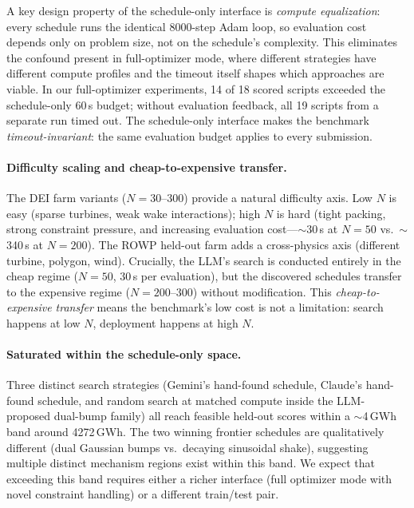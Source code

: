 A key design property of the schedule-only interface is
\emph{compute equalization}: every schedule runs the identical
8000-step Adam loop, so evaluation cost depends only on problem
size, not on the schedule's complexity. This eliminates the
confound present in full-optimizer mode, where different strategies
have different compute profiles and the timeout itself shapes which
approaches are viable. In our full-optimizer experiments, 14 of 18
scored scripts exceeded the schedule-only 60\,s budget; without
evaluation feedback, all 19 scripts from a separate run timed out.
The schedule-only interface makes the benchmark \emph{timeout-invariant}:
the same evaluation budget applies to every submission.

\paragraph{Difficulty scaling and cheap-to-expensive transfer.}
The DEI farm variants ($N = 30$--$300$) provide a natural difficulty
axis. Low $N$ is easy (sparse turbines, weak wake interactions);
high $N$ is hard (tight packing, strong constraint pressure,
and increasing evaluation cost---$\sim$30\,s at $N\!=\!50$ vs.\
$\sim$340\,s at $N\!=\!200$). The ROWP held-out farm adds a
cross-physics axis (different turbine, polygon, wind). Crucially,
the LLM's search is conducted entirely in the cheap regime
($N\!=\!50$, 30\,s per evaluation), but the discovered schedules
transfer to the expensive regime ($N\!=\!200$--$300$) without
modification. This \emph{cheap-to-expensive transfer} means the
benchmark's low cost is not a limitation: search happens at
low $N$, deployment happens at high $N$.

\paragraph{Saturated within the schedule-only space.}
Three distinct search strategies (Gemini's hand-found schedule,
Claude's hand-found schedule, and random search at matched compute
inside the LLM-proposed dual-bump family) all reach feasible held-out
scores within a $\sim$4\,GWh band around 4272\,GWh. The two winning
frontier schedules are qualitatively different (dual Gaussian bumps
vs.\ decaying sinusoidal shake), suggesting multiple distinct
mechanism regions exist within this band. We expect that exceeding
this band requires either a richer interface (full optimizer mode
with novel constraint handling) or a different train/test pair.

